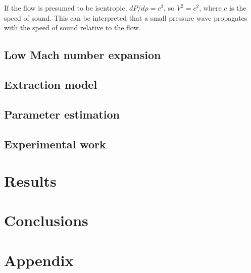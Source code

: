 \documentclass[a4paper,fleqn]{cas-dc}
\begin{document}
If the flow is presumed to be isentropic, $dP/d\rho = c^2$, so $V^2=c^2$, where $c$ is the speed of sound. This can be interpreted that a small pressure wave propagates with the speed of sound relative to the flow.

\subsection{Low Mach number expansion}


\subsection{Extraction model} \label{CH: Extraction_model}


%

\subsection{Parameter estimation} \label{CH: Parameter_estimation}


\subsection{Experimental work}


\section{Results}


\section{Conclusions}

\clearpage
%



\clearpage \appendix \label{appendix}
\section{Appendix} 
\end{document}
